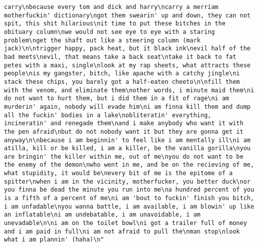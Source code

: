 \documentclass[]{article}
\begin{document}
\begin{verbatim}
carry\nbecause every tom and dick and harry\ncarry a merriam motherfuckin' dictionary\ngot them swearin' up and down, they can not spit, this shit hilarious\nit time to put these bitches in the obituary column\nwe would not see eye to eye with a staring problem\nget the shaft out like a steering column (mark jack)\n\ntrigger happy, pack heat, but it black ink\nevil half of the bad meets\nevil, that means take a back seat\ntake it back to fat petes with a maxi, single\nlook at my rap sheets, what attracts these people\nis my gangster, bitch, like apache with a catchy jingle\ni stack these chips, you barely got a half-eaten cheeto\n\nfill them with the venom, and eliminate them\nother words, i minute maid them\ni do not want to hurt them, but i did them in a fit of rage\ni am murderin' again, nobody will evade him\ni am finna kill them and dump all the fuckin' bodies in a lake\nobliteratin' everything, incineratin' and renegade them\nand i make anybody who want it with the pen afraid\nbut do not nobody want it but they are gonna get it anyway\n\nbecause i am beginnin' to feel like i am mentally ill\ni am atilla, kill or be killed, i am a killer, be the vanilla gorilla\nyou are bringin' the killer within me, out of me\nyou do not want to be the enemy of the demon\nwho went in me, and be on the recieving of me, what stupidity, it would be\nevery bit of me is the epitome of a spitter\nwhen i am in the vicinity, motherfucker, you better duck\nor you finna be dead the minute you run into me\na hundred percent of you is a fifth of a percent of me\ni am 'bout to fuckin' finish you bitch, i am unfadable\nyou wanna battle, i am available, i am blowin' up like an inflatable\ni am undebatable, i am unavoidable, i am unevadable\n\ni am on the toilet bowl\ni got a trailer full of money and i am paid in full\ni am not afraid to pull the\nman stop\nlook what i am plannin' (haha)\n"                                                                                                                                                                                                                                                                                                                                                                                                                                                                                                                                                                                                                                                                                                                                                                                                                                                                                                                                                                                                                                                                                               

\end{verbatim}
\end{document}
